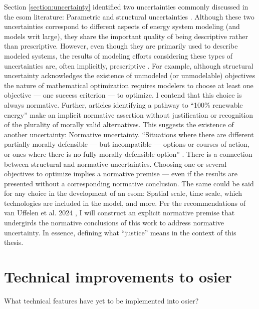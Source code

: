Section \ref{section:uncertainty} identified two uncertainties commonly
discussed in the \ac{esom} literature: Parametric and structural uncertainties
\cite{decarolis_using_2011}. Although these two uncertainties correspond to
different aspects of energy system modeling (and models writ large), they share
the important quality of being descriptive rather than prescriptive. However,
even though they are primarily used to describe modeled systems, the results of
modeling efforts considering these types of uncertainties are, often implicitly,
prescriptive
\cite{yue_least_2020,decarolis_nc_2018,cochran_la100_2021,bussar_optimal_2014}.
For example, although structural uncertainty acknowledges the existence of
unmodeled (or unmodelable) objectives the nature of mathematical optimization
requires modelers to choose at least one objective --- one success criterion ---
to optimize. I contend that this choice is always normative. Further, articles
identifying a pathway to ``100\% renewable energy'' make an implicit normative
assertion without justification or recognition of the plurality of morally valid
alternatives. This suggests the existence of another uncertainty: Normative
uncertainty. ``Situations where there are different partially morally defensible
--- but incompatible --- options or courses of action, or ones where there is no
fully morally defensible option''
\cite{taebi_bridging_2017,van_uffelen_revisiting_2024}. There is a connection
between structural and normative uncertainties. Choosing one or several
objectives to optimize implies a normative premise --- even if the results are
presented without a corresponding normative conclusion. The same could be said
for any choice in the development of an \ac{esom}: Spatial scale, time scale,
which technologies are included in the model, and more. Per the recommendations
of van Uffelen et al. 2024 \cite{van_uffelen_revisiting_2024}, I will construct
an explicit normative premise that undergirds the normative conclusions of this
work to address normative uncertainty. In essence, defining what ``justice''
means in the context of this thesis. 



\section{Technical improvements to \ac{osier}}

What technical features have yet to be implemented into \ac{osier}?


